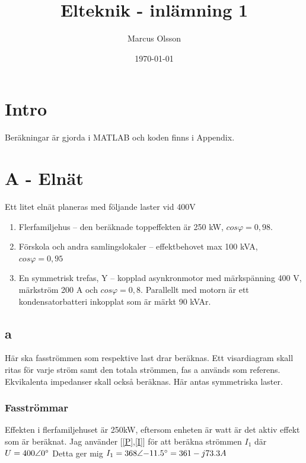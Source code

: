 \documentclass{article}
\title{Elteknik - inlämning 1} %
\author{
	\begin{tabular}{l r}
    Marcus Olsson \\
    \\
    \end{tabular}
    }
\date{\today} %
\begin{document}
\maketitle %
\tableofcontents
\clearpage
\section{Intro}
Beräkningar är gjorda i MATLAB och koden finns i Appendix.

\section{A - Elnät}
Ett litet elnät planeras med följande laster vid 400V

\begin{enumerate}
	\item Flerfamiljehus – den beräknade toppeffekten är 250 kW, $cos\varphi = 0,98$.
	\item Förskola och andra samlingslokaler – effektbehovet max 100 kVA, $cos\varphi = 0,95$
	\item En symmetrisk trefas, Y – kopplad asynkronmotor med märkspänning 400 V,
märkström 200 A och $cos\varphi = 0,8$. Parallellt med motorn är ett kondensatorbatteri
inkopplat som är märkt 90 kVAr.
\end{enumerate}

\subsection{a}
Här ska fasströmmen som respektive last drar beräknas.
Ett visardiagram skall ritas för varje ström samt den totala strömmen, fas a används som referens.
Ekvikalenta impedanser skall också beräknas.
Här antas symmetriska laster.

  \subsubsection{Fasströmmar}
  Effekten i flerfamiljehuset är 250kW, eftersom enheten är watt är det aktiv effekt som är beräknat.
  Jag använder [\ref{P},\ref{I}] för att beräkna strömmen $I_1$ där $U=400\angle{0\degree}$
  Detta ger mig $I_1=368\angle{-11.5\degree}=361-j73.3 A$
\end{document}
